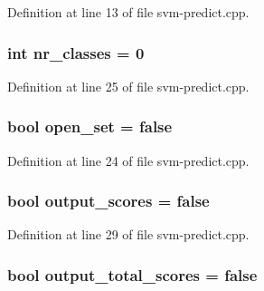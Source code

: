 Definition at line 13 of file svm-\/predict.\-cpp.

\hypertarget{_2svm-predict_8cpp_ad88594354ad0cd1b5f3cebf37f8381cf}{
\subsubsection[{nr\-\_\-classes}]{\setlength{\rightskip}{0pt plus 5cm}int nr\-\_\-classes = 0}}\label{_2svm-predict_8cpp_ad88594354ad0cd1b5f3cebf37f8381cf}


Definition at line 25 of file svm-\/predict.\-cpp.

\hypertarget{_2svm-predict_8cpp_a17843ee1d8102ef588a3f997e827bc70}{
\subsubsection[{open\-\_\-set}]{\setlength{\rightskip}{0pt plus 5cm}bool open\-\_\-set = false}}\label{_2svm-predict_8cpp_a17843ee1d8102ef588a3f997e827bc70}


Definition at line 24 of file svm-\/predict.\-cpp.

\hypertarget{_2svm-predict_8cpp_a7ce2b5cbc37a137a91ecc0cf035faba7}{
\subsubsection[{output\-\_\-scores}]{\setlength{\rightskip}{0pt plus 5cm}bool output\-\_\-scores = false}}\label{_2svm-predict_8cpp_a7ce2b5cbc37a137a91ecc0cf035faba7}


Definition at line 29 of file svm-\/predict.\-cpp.

\hypertarget{_2svm-predict_8cpp_aa63d504586762ed1e2b057a76018d0fd}{
\subsubsection[{output\-\_\-total\-\_\-scores}]{\setlength{\rightskip}{0pt plus 5cm}bool output\-\_\-total\-\_\-scores = false}}\label{_2svm-predict_8cpp_aa63d504586762ed1e2b057a76018d0fd}


